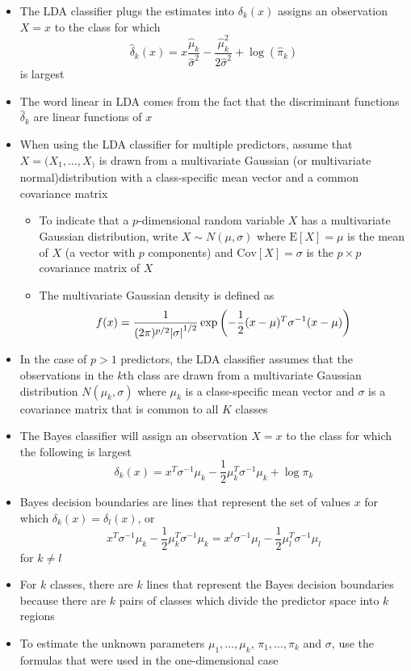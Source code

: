 \documentclass[12pt]{article}
\begin{document}
\begin{itemize}
\item The LDA classifier plugs the estimates into $\delta_k(x)$ assigns an observation $X=x$ to the class for which $$ \hat{\delta}_k(x) = x\frac{\hat{\mu}_k}{\hat{\sigma}^2} - \frac{\hat{\mu}_k^2}{2\hat{\sigma}^2} + \log(\hat{\pi}_k) $$ is largest 
\item The word linear in LDA comes from the fact that the discriminant functions $\hat{\delta}_k$ are linear functions of $x$
\item When using the LDA classifier for multiple predictors, assume that $X = (X_1,\dots,X_)$ is drawn from a multivariate Gaussian (or multivariate normal)distribution with a class-specific mean vector and a common covariance matrix \begin{itemize}
\item To indicate that a $p$-dimensional random variable $X$ has a multivariate Gaussian distribution, write $X \sim N(\mu, \sigma)$ where $\text{E}[X] = \mu$ is the mean of $X$ (a vector with $p$ components) and $\text{Cov}[X] = \sigma$ is the $p\times p$ covariance matrix of $X$
\item The multivariate Gaussian density is defined as $$ f(x) = \frac{1}{(2\pi)^{p/2} \abs{\sigma}^{1/2}} \exp\left( -\frac{1}{2}(x-\mu)^T\sigma^{-1}(x-\mu) \right) $$ \end{itemize}
\item In the case of $p>1$ predictors, the LDA classifier assumes that the observations in the $k$th class are drawn from a multivariate Gaussian distribution $N(\mu_k, \sigma)$ where $\mu_k$ is a class-specific mean vector and $\sigma$ is a covariance matrix that is common to all $K$ classes 
\item The Bayes classifier will assign an observation $X=x$ to the class for which the following is largest $$ \delta_k(x) = x^T\sigma^{-1}\mu_k - \frac{1}{2}\mu_k^T\sigma^{-1}\mu_k + \log \pi_k $$ 
\item Bayes decision boundaries are lines that represent the set of values $x$ for which $\delta_k(x) = \delta_l(x)$, or $$x^T\sigma^{-1}\mu_k - \frac{1}{2}\mu_k^T\sigma^{-1}\mu_k = x^t\sigma^{-1}\mu_l - \frac{1}{2}\mu_l^T\sigma^{-1}\mu_l $$ for $k \neq l$
\item For $k$ classes, there are $k$ lines that represent the Bayes decision boundaries because there are $k$ pairs of classes which divide the predictor space into $k$ regions
\item To estimate the unknown parameters $\mu_1,\dots,\mu_k$, $\pi_1,\dots,\pi_k$ and $\sigma$, use the formulas that were used in the one-dimensional case 

\end{itemize}
\end{document}
